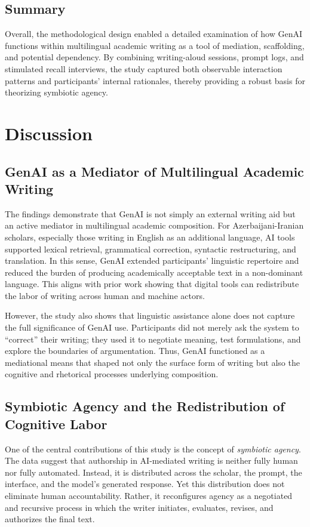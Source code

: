 \documentclass[12pt]{article}
\begin{document}
\subsection{Summary}
Overall, the methodological design enabled a detailed examination of how GenAI functions within multilingual academic writing as a tool of mediation, scaffolding, and potential dependency. By combining writing-aloud sessions, prompt logs, and stimulated recall interviews, the study captured both observable interaction patterns and participants' internal rationales, thereby providing a robust basis for theorizing symbiotic agency.

\section{Discussion}

\subsection{GenAI as a Mediator of Multilingual Academic Writing}
The findings demonstrate that GenAI is not simply an external writing aid but an active mediator in multilingual academic composition. For Azerbaijani-Iranian scholars, especially those writing in English as an additional language, AI tools supported lexical retrieval, grammatical correction, syntactic restructuring, and translation. In this sense, GenAI extended participants' linguistic repertoire and reduced the burden of producing academically acceptable text in a non-dominant language. This aligns with prior work showing that digital tools can redistribute the labor of writing across human and machine actors.

However, the study also shows that linguistic assistance alone does not capture the full significance of GenAI use. Participants did not merely ask the system to ``correct'' their writing; they used it to negotiate meaning, test formulations, and explore the boundaries of argumentation. Thus, GenAI functioned as a mediational means that shaped not only the surface form of writing but also the cognitive and rhetorical processes underlying composition.

\subsection{Symbiotic Agency and the Redistribution of Cognitive Labor}
One of the central contributions of this study is the concept of \emph{symbiotic agency}. The data suggest that authorship in AI-mediated writing is neither fully human nor fully automated. Instead, it is distributed across the scholar, the prompt, the interface, and the model's generated response. Yet this distribution does not eliminate human accountability. Rather, it reconfigures agency as a negotiated and recursive process in which the writer initiates, evaluates, revises, and authorizes the final text.
\end{document}
